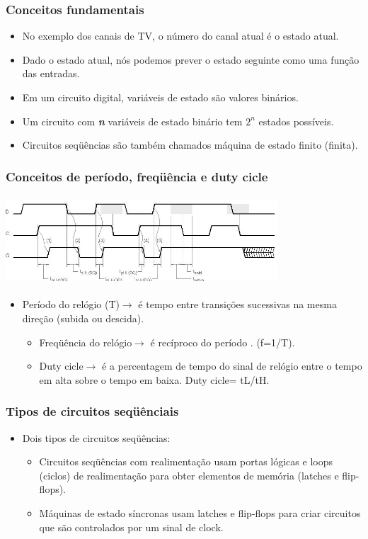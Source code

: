 \documentclass{beamer}
\begin{document}
\begin{frame}
 \frametitle{Conceitos fundamentais}
 \begin{itemize}
  \item No exemplo dos canais de TV, o número do canal atual é o estado atual.\pause
  \item Dado o estado atual, nós podemos prever o estado seguinte como uma função das entradas.\pause
  \item Em um circuito digital, variáveis de estado são valores binários.\pause
  \item Um circuito com \textbf{\emph{n}} variáveis de estado binário tem ${2^n}$ estados possíveis.
  \item Circuitos seqüências são também chamados máquina de estado  finito (finita).
 \end{itemize}
\end{frame}

\begin{frame}
 \frametitle{Conceitos de período, freqüência e duty cicle}
 \includegraphics[height = 1.3in, width = 4in]{slide10_filomeno}
 \begin{itemize}
  \item Período do relógio (T)$\xrightarrow{}$ é tempo entre transições sucessivas na mesma direção (subida ou descida).\pause
  \begin{itemize}
   \item Freqüência do relógio$\xrightarrow{}$ é recíproco do período . (f=1/T).\pause
   \item Duty cicle$\xrightarrow{}$ é a percentagem de tempo  do sinal de relógio entre o tempo em alta sobre o tempo em baixa. Duty cicle= tL/tH.
  \end{itemize}
 \end{itemize}
\end{frame}

\begin{frame}
 \frametitle{Tipos de circuitos seqüênciais}
 \begin{itemize}
  \item Dois tipos de circuitos seqüências:\pause
  \begin{itemize}
   \item Circuitos seqüências com realimentação usam portas lógicas e loops (ciclos) de realimentação para obter elementos de memória (latches e flip-flops).\pause
   \item Máquinas de estado síncronas usam latches e flip-flops para criar circuitos que são controlados por um sinal de clock.
  \end{itemize}
 \end{itemize}
\end{frame}
\end{document}
